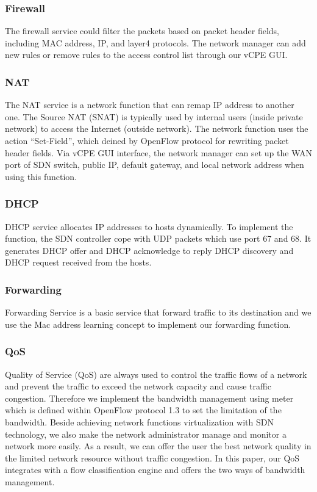 \documentclass[journal]{IEEEtran}
\begin{document}
\subsubsection{Firewall}
The firewall service could filter the packets based on packet header fields, including MAC address, IP, and layer4 protocols. The network manager can add new rules or remove rules to the access control list through our vCPE GUI.

\subsubsection{NAT}
The NAT service is a network function that can remap  IP address to another one. The Source NAT (SNAT) is typically used by internal users (inside private network) to access the Internet (outside network). The network function uses the action “Set-Field”, which deined by OpenFlow protocol for rewriting packet header fields. Via vCPE GUI interface, the network manager can set up the WAN port of SDN switch, public IP, default gateway, and local network address when using this function.

\subsubsection{DHCP}
DHCP service allocates IP addresses to hosts dynamically. To implement the function, the SDN controller cope with UDP packets which use port 67 and 68. It generates DHCP offer and DHCP acknowledge to reply DHCP discovery and DHCP request received from the hosts.

\subsubsection{Forwarding}
Forwarding Service is a basic service that forward traffic to its destination and we use the Mac address learning concept to implement our forwarding function.

\subsubsection{QoS}
Quality of Service (QoS) are always used to control the traffic flows of a network and prevent the traffic to exceed the network capacity and cause traffic congestion. Therefore we implement the bandwidth management using meter which is defined within OpenFlow protocol 1.3 to set the limitation of the bandwidth.
Beside achieving network functions virtualization with SDN technology, we also make the network administrator manage and monitor a network more easily. As a result, we can offer the user the best network quality in the limited network resource without traffic congestion.
In this paper, our QoS integrates with a flow classification engine and offers the two ways of bandwidth management.
\end{document}
